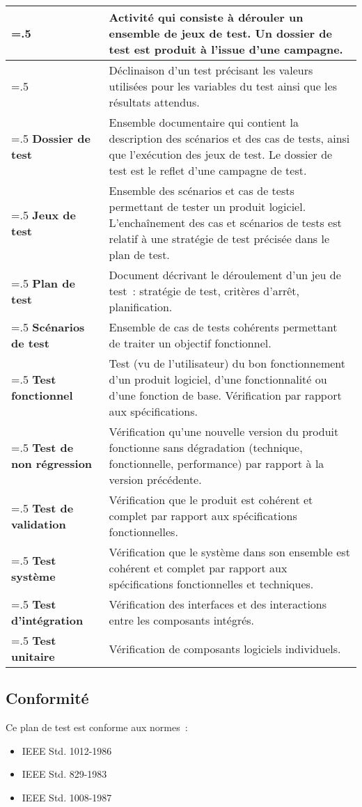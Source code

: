 \begin{table}[H]
    \centering
    \begin{tabularx}{\textwidth}{|>{\hsize=.5\hsize}X|>{\hsize=1.5\hsize}X|}
      \hline
    {\bf Campagne de test} & Activité qui consiste à dérouler un ensemble de jeux de test. 
    Un dossier de test est produit à l’issue d’une campagne.\\
    \hline
    {\bf Cas de test} & Déclinaison d’un test précisant les valeurs utilisées pour les variables du test ainsi que les résultats attendus.\\
    \hline
    {\bf Dossier de test} & Ensemble documentaire qui contient la description des scénarios et des cas de tests, ainsi que l’exécution des jeux de test. 
    Le dossier de test est le reflet d’une campagne de test. \\
    \hline
    {\bf Jeux de test} & Ensemble des scénarios et cas de tests permettant de tester un produit logiciel. 
    L’enchaînement des cas et scénarios de tests est relatif à une stratégie de test précisée dans le plan de test.\\
    \hline
    {\bf Plan de test} & Document décrivant le déroulement d’un jeu de test : stratégie de test, critères d’arrêt, planification.\\
    \hline
    {\bf Scénarios de test} & Ensemble de cas de tests cohérents permettant de traiter un objectif fonctionnel.\\
    \hline
    {\bf Test fonctionnel} & Test (vu de l’utilisateur) du bon fonctionnement d’un produit logiciel, d’une fonctionnalité ou d’une fonction de base. 
    Vérification par rapport aux spécifications.\\
    \hline
    {\bf Test de non régression} & Vérification qu’une nouvelle version du produit fonctionne sans dégradation (technique, fonctionnelle, performance) par rapport à la version précédente.\\
    \hline
    {\bf Test de validation} & Vérification que le produit est cohérent et complet par rapport aux spécifications fonctionnelles.\\
    \hline
    {\bf Test système} & Vérification que le système dans son ensemble est cohérent et complet par rapport aux spécifications fonctionnelles et techniques.\\
    \hline
    {\bf Test d'intégration} & Vérification des interfaces et des interactions entre les composants intégrés.\\
    \hline
    {\bf Test unitaire} & Vérification de composants logiciels individuels.\\
    \hline
  \end{tabularx}
\end{table}

\subsection{Conformité}
\label{sec:intro:conf}

Ce plan de test est conforme aux normes~:
\begin{itemize}
\item IEEE Std. 1012-1986
\item IEEE Std. 829-1983
\item IEEE Std. 1008-1987
\end{itemize}
